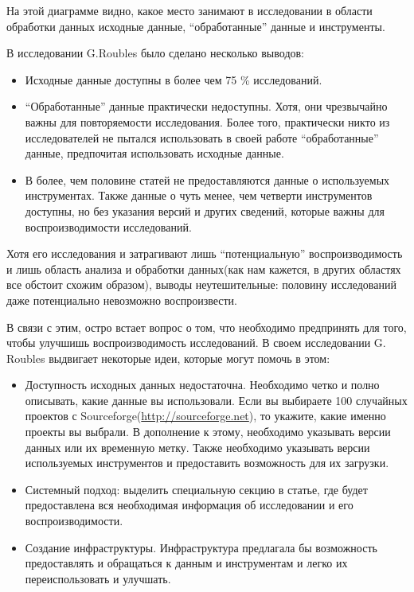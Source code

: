 \documentclass[12pt,a4paper]{extarticle}
\begin{document}
На этой диаграмме видно, какое место занимают в исследовании в области обработки
данных исходные данные, ``обработанные'' данные и инструменты.


В исследовании G.Roubles было сделано несколько выводов:
\begin{itemize}
	\item Исходные данные доступны в более чем 75 \% исследований.
	\item ``Обработанные'' данные практически недоступны. Хотя, они чрезвычайно важны для повторяемости исследования. Более того, практически никто из исследователей не пытался использовать в своей работе ``обработанные'' данные, предпочитая использовать исходные данные.
	\item В более, чем половине статей не предоставляются данные о используемых инструментах.  Также данные о чуть менее, чем четверти инструментов доступны, но без указания версий и других сведений, которые важны для воспроизводимости исследований.
\end{itemize}


Хотя его исследования и затрагивают лишь “потенциальную” воспроизводимость и лишь область анализа и обработки данных(как нам кажется, в других областях все обстоит схожим образом), выводы неутешительные: половину исследований даже потенциально невозможно воспроизвести.


В связи с этим, остро встает вопрос о том, что необходимо предпринять для того, чтобы улучшишь воспроизводимость исследований. В своем исследовании G. Roubles выдвигает некоторые идеи, которые могут помочь в этом:

\begin{itemize}
	\item Доступность исходных данных недостаточна. Необходимо четко и полно описывать, какие данные вы использовали. Если вы выбираете 100 случайных проектов с Sourceforge(\url{http://sourceforge.net}), то укажите, какие именно проекты вы выбрали. В дополнение к этому, необходимо указывать версии данных или их временную метку. Также необходимо указывать версии используемых инструментов и предоставить возможность для их загрузки.
	\item Системный подход: выделить специальную секцию в статье, где будет предоставлена вся необходимая информация об исследовании и его воспроизводимости.
	\item Создание инфраструктуры. Инфраструктура предлагала бы возможность предоставлять и обращаться к данным и инструментам и легко их переиспользовать и улучшать.
\end{itemize}
\end{document}

